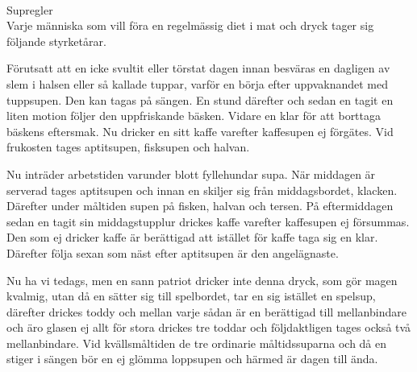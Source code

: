 \documentclass[a6paper, 10pt, twoside]{article}
\begin{document}
\noindent
{}
\vspace{10pt} \\
\Large Supregler\\
\small 
Varje människa som vill föra en regelmässig diet i mat och dryck tager sig följande styrketårar.

Förutsatt att en icke svultit eller törstat dagen innan besväras en dagligen av slem i halsen eller så kallade tuppar, varför en börja efter uppvaknandet med tuppsupen. Den kan tagas på sängen. En stund därefter och sedan en tagit en liten motion följer den uppfriskande bäsken. Vidare en klar för att borttaga bäskens eftersmak. Nu dricker en sitt kaffe varefter kaffesupen ej förgätes. Vid frukosten tages aptitsupen, fisksupen och halvan.

Nu inträder arbetstiden varunder blott fyllehundar supa. När middagen är serverad tages aptitsupen och innan en skiljer sig från middagsbordet, klacken. Därefter under måltiden supen på fisken, halvan och tersen. På eftermiddagen sedan en tagit sin middagstupplur drickes kaffe varefter kaffesupen ej försummas. Den som ej dricker kaffe är berättigad att istället för kaffe taga sig en klar. Därefter följa sexan som näst efter aptitsupen är den angelägnaste.

Nu ha vi tedags, men en sann patriot dricker inte denna dryck, som gör magen kvalmig, utan då en sätter sig till spelbordet, tar en sig istället en spelsup, därefter drickes toddy och mellan varje sådan är en berättigad till mellanbindare och äro glasen ej allt för stora drickes tre toddar och följdaktligen tages också två mellanbindare. Vid kvällsmåltiden de tre ordinarie måltidssuparna och då en stiger i sängen bör en ej glömma loppsupen och härmed är dagen till ända. 
\end{document}
